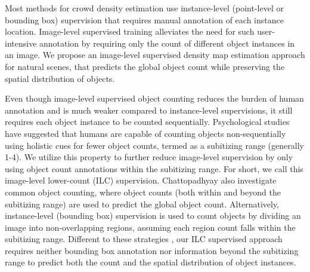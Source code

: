 \documentclass[10pt,twocolumn,letterpaper]{article}
\begin{document}
Most methods for crowd density estimation use instance-level (point-level or bounding box) supervision  that requires manual annotation of each instance location.  Image-level supervised training alleviates the need for such user-intensive annotation by requiring only the count of different object instances in an image. We propose an image-level supervised density map estimation approach for natural scenes, that predicts the global object count while preserving the spatial distribution of objects.



 












Even though image-level supervised object counting reduces the burden of human annotation and is much weaker compared to instance-level supervisions, it still requires each object instance to be counted sequentially.
 Psychological studies \cite{psychological_study1,psychological_study2,psychological_study3,psychological_study4} have suggested that humans are capable of counting objects non-sequentially using holistic cues for fewer object counts, termed as a subitizing range (generally 1-4). We utilize this property to further reduce image-level supervision by only using object count annotations within the subitizing range. For short, we call this image-level lower-count (ILC) supervision. Chattopadhyay \etal\cite{Chattopadhyay_2017_CVPR} also investigate common object counting, where  object counts (both within and beyond the subitizing range) are used to predict the global object count. Alternatively, instance-level (bounding box) supervision is used to count objects by dividing an image into non-overlapping regions, assuming each region count falls within the subitizing range. Different to these strategies \cite{Chattopadhyay_2017_CVPR}, our ILC supervised approach requires neither bounding box annotation nor information beyond the subitizing range to predict both the  count and the spatial distribution of object instances.
 
\end{document}
